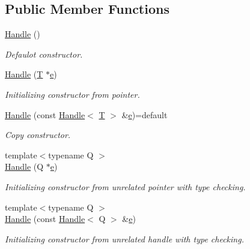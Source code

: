 \subsection*{Public Member Functions}
\begin{DoxyCompactItemize}
\item 
\hyperlink{class_d_d4hep_1_1_handle_a97b64b3f6c35305e77fe00bc2f73aeb7}{Handle} ()
\begin{DoxyCompactList}\small\item\em Defaulot constructor. \end{DoxyCompactList}\item 
\hyperlink{class_d_d4hep_1_1_handle_aae5fd1b909826186406e57e41679ab8d}{Handle} (\hyperlink{class_t}{T} $\ast$\hyperlink{_volumes_8cpp_a8a9a1f93e9b09afccaec215310e64142}{e})
\begin{DoxyCompactList}\small\item\em Initializing constructor from pointer. \end{DoxyCompactList}\item 
\hyperlink{class_d_d4hep_1_1_handle_a3c86f2f41a1ac3c3b86c179be2d4d67b}{Handle} (const \hyperlink{class_d_d4hep_1_1_handle}{Handle}$<$ \hyperlink{class_t}{T} $>$ \&\hyperlink{_volumes_8cpp_a8a9a1f93e9b09afccaec215310e64142}{e})=default
\begin{DoxyCompactList}\small\item\em Copy constructor. \end{DoxyCompactList}\item 
{\footnotesize template$<$typename Q $>$ }\\\hyperlink{class_d_d4hep_1_1_handle_afc97f7c5cabc4750eb8c060080c3e433}{Handle} (Q $\ast$\hyperlink{_volumes_8cpp_a8a9a1f93e9b09afccaec215310e64142}{e})
\begin{DoxyCompactList}\small\item\em Initializing constructor from unrelated pointer with type checking. \end{DoxyCompactList}\item 
{\footnotesize template$<$typename Q $>$ }\\\hyperlink{class_d_d4hep_1_1_handle_a792c02f1acfc5a4356c8d390b00e3c68}{Handle} (const \hyperlink{class_d_d4hep_1_1_handle}{Handle}$<$ Q $>$ \&\hyperlink{_volumes_8cpp_a8a9a1f93e9b09afccaec215310e64142}{e})
\begin{DoxyCompactList}\small\item\em Initializing constructor from unrelated handle with type checking. \end{DoxyCompactList}\item 

\end{DoxyCompactItemize}
